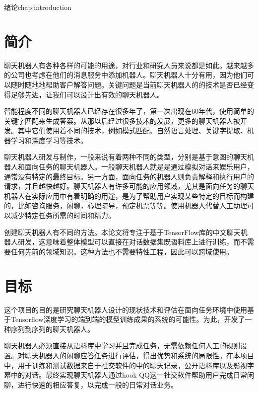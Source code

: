 \begin{cuzchapter}{绪论}{chap:introduction}

\section{简介}\label{sec:background}

聊天机器人有各种各样的可能的用途，对行业和研究人员来说都是如此。越来越多的公司也考虑在他们的消息服务中添加机器人。聊天机器人十分有用，因为他们可以随时随地地帮助客户解答问题。关键问题是当前聊天机器人的的技术是否已经变得足够先进，让我们可以设计出有效的聊天机器人。

智能程度不同的聊天机器人已经存在很多年了，第一次出现在60年代，\cite{Weizenbaum:1966:ECP:365153.365168}使用简单的关键字匹配来生成答案。从那以后经过很多技术的发展，更多的聊天机器人被开发。其中它们使用着不同的技术，例如模式匹配、自然语言处理、关键字提取、机器学习和深度学习等技术。

聊天机器人研发与制作，一般来说有着两种不同的类型，分别是基于意图的聊天机器人和面向任务的聊天机器人。一般聊天机器人就是是通过模拟对话来娱乐用户，通常没有特定的最终目标。另一方面，面向任务的机器人则负责解释和执行用户的请求，并且越快越好。聊天机器人有许多可能的应用领域，尤其是面向任务的聊天机器人在实际应用中有着明确的用途，是为了帮助用户实现某些特定的目标而构建的，比如咨询服务，闲聊，心理疏导，预定机票等等。使用机器人代替人工助理可以减少特定任务所需的时间和精力。

创建聊天机器人有不同的方法。本论文将专注于基于TensorFlow库的中文聊天机器人研发，这意味着整体模型可以直接在对话数据集既语料库上进行训练，而不需要任何先前的领域知识。这种方法也不需要特性工程，因此可以跨域使用。
\section{目标}\label{sec:background}

这个项目的目的是研究聊天机器人设计的现状技术和评估在面向任务环境中使用基于Tensorflow深度学习的端到端的模型训练成果的系统的可能性。为此，开发了一种序列到序列的聊天机器人。

聊天机器人必须直接从语料库中学习并且完成任务，无需依赖任何人工的规则设置。对聊天机器人的闲聊应答任务进行评估，得出优势和系统的局限性。在本项目中，用于训练和测试数据来自于社交软件的中的聊天记录，公开语料库以及影视字幕中的对话。最终实现聊天机器人通过hook QQ这一社交软件帮助用户完成日常闲聊，进行快速的相应答复，以完成一般的日常对话业务。
\end{cuzchapter}